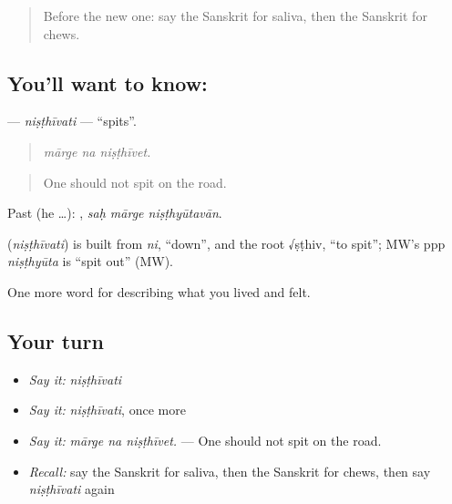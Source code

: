 \label{lesson:SA-C472-nisthivati}



\begin{quote}
Before the new one: say the Sanskrit for saliva, then the Sanskrit for chews.
\end{quote}

\subsection*{You'll want to know: }
\textbf{} — \emph{niṣṭhīvati} — \textquotedblleft{}spits\textquotedblright{}.

\begin{quote}
  
\end{quote}

\begin{quote}
\emph{mārge na niṣṭhīvet.}
\end{quote}

\begin{quote}
One should not spit on the road.
\end{quote}

Past (he …):   , \emph{saḥ mārge niṣṭhyūtavān}.

\begin{cousinweb}
\textbf{} (\emph{niṣṭhīvati}) is built from \emph{ni}, \textquotedblleft{}down\textquotedblright{}, and the root √ṣṭhiv, \textquotedblleft{}to spit\textquotedblright{}; MW's ppp \emph{niṣṭhyūta} is \textquotedblleft{}spit out\textquotedblright{} (MW).
\end{cousinweb}

\begin{grammarlens}[title={What you've built}]
One more word for describing what you lived and felt.
\end{grammarlens}

\subsection*{Your turn}
\begin{itemize}
\raggedright
  \item \emph{Say it:} \emph{niṣṭhīvati}
  \item \emph{Say it:} \emph{niṣṭhīvati}, once more
  \item \emph{Say it:} \emph{mārge na niṣṭhīvet.} — One should not spit on the road.
  \item \emph{Recall:} say the Sanskrit for saliva, then the Sanskrit for chews, then say \emph{niṣṭhīvati} again
\end{itemize}


